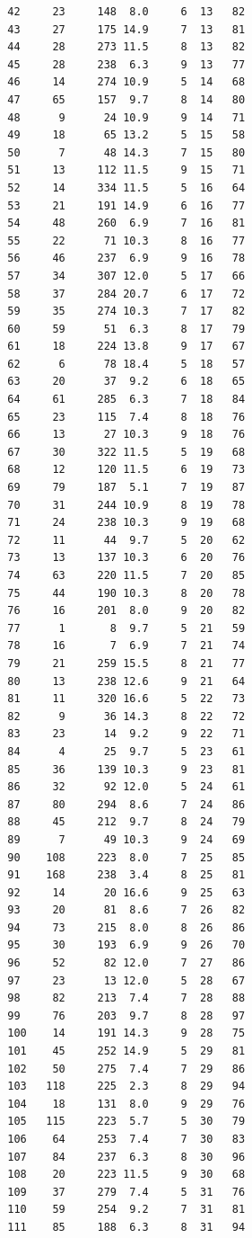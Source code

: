 \documentclass[10pt]{article}
\begin{document}
\begin{enumerate}
\begin{verbatim}
        42     23     148  8.0     6  13   82
        43     27     175 14.9     7  13   81
        44     28     273 11.5     8  13   82
        45     28     238  6.3     9  13   77
        46     14     274 10.9     5  14   68
        47     65     157  9.7     8  14   80
        48      9      24 10.9     9  14   71
        49     18      65 13.2     5  15   58
        50      7      48 14.3     7  15   80
        51     13     112 11.5     9  15   71
        52     14     334 11.5     5  16   64
        53     21     191 14.9     6  16   77
        54     48     260  6.9     7  16   81
        55     22      71 10.3     8  16   77
        56     46     237  6.9     9  16   78
        57     34     307 12.0     5  17   66
        58     37     284 20.7     6  17   72
        59     35     274 10.3     7  17   82
        60     59      51  6.3     8  17   79
        61     18     224 13.8     9  17   67
        62      6      78 18.4     5  18   57
        63     20      37  9.2     6  18   65
        64     61     285  6.3     7  18   84
        65     23     115  7.4     8  18   76
        66     13      27 10.3     9  18   76
        67     30     322 11.5     5  19   68
        68     12     120 11.5     6  19   73
        69     79     187  5.1     7  19   87
        70     31     244 10.9     8  19   78
        71     24     238 10.3     9  19   68
        72     11      44  9.7     5  20   62
        73     13     137 10.3     6  20   76
        74     63     220 11.5     7  20   85
        75     44     190 10.3     8  20   78
        76     16     201  8.0     9  20   82
        77      1       8  9.7     5  21   59
        78     16       7  6.9     7  21   74
        79     21     259 15.5     8  21   77
        80     13     238 12.6     9  21   64
        81     11     320 16.6     5  22   73
        82      9      36 14.3     8  22   72
        83     23      14  9.2     9  22   71
        84      4      25  9.7     5  23   61
        85     36     139 10.3     9  23   81
        86     32      92 12.0     5  24   61
        87     80     294  8.6     7  24   86
        88     45     212  9.7     8  24   79
        89      7      49 10.3     9  24   69
        90    108     223  8.0     7  25   85
        91    168     238  3.4     8  25   81
        92     14      20 16.6     9  25   63
        93     20      81  8.6     7  26   82
        94     73     215  8.0     8  26   86
        95     30     193  6.9     9  26   70
        96     52      82 12.0     7  27   86
        97     23      13 12.0     5  28   67
        98     82     213  7.4     7  28   88
        99     76     203  9.7     8  28   97
        100    14     191 14.3     9  28   75
        101    45     252 14.9     5  29   81
        102    50     275  7.4     7  29   86
        103   118     225  2.3     8  29   94
        104    18     131  8.0     9  29   76
        105   115     223  5.7     5  30   79
        106    64     253  7.4     7  30   83
        107    84     237  6.3     8  30   96
        108    20     223 11.5     9  30   68
        109    37     279  7.4     5  31   76
        110    59     254  9.2     7  31   81
        111    85     188  6.3     8  31   94
        \end{verbatim}
\end{enumerate}
\end{document}
